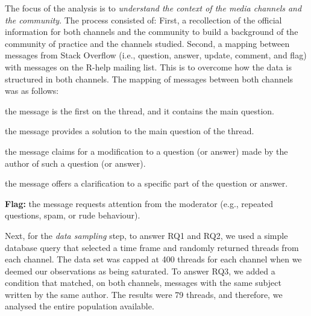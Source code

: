 \documentclass{sig-alternate-05-2015}
\begin{document}
	The focus of the analysis is to \textit{understand the context of the media channels and the community}.
	The process consisted of:
	First, a recollection of the official information for both channels and the community to build a background of the community of practice and the channels studied.
	Second, a mapping between messages from Stack Overflow (i.e., question, answer, update, comment, and flag) with messages on the R-help mailing list.
    This is to overcome how the data is structured in both channels.
    The mapping of messages between both channels was as follows:

	\begin{description}
      \setlength{\itemsep}{3pt}
      \setlength{\parskip}{0pt}
      \setlength{\parsep}{0pt}
		\item[Question:] the message is the first on the thread, and it contains the main question.
		\item[Answer:] the message provides a solution to the main question of the thread.
	 	\item[Update:] the message claims for a modification to a question (or answer) made by the author of such a question (or answer).
		\item[Comment:] the message offers a clarification to a specific part of the question or answer.
		\item \textbf{Flag:} the message requests attention from the moderator (e.g., repeated questions, spam, or rude behaviour).
	\end{description}

	Next, for the \textit{data sampling} step, to answer RQ1 and RQ2, we used a simple database query that selected a time frame and randomly returned threads from each channel.
	The data set was capped at 400 threads for each channel when we deemed our observations as being saturated.
	To answer RQ3, we added a condition that matched, on both channels, messages with the same subject written by the same author.
	The results were 79 threads, and therefore, we analysed the entire population available. 

\end{document}
